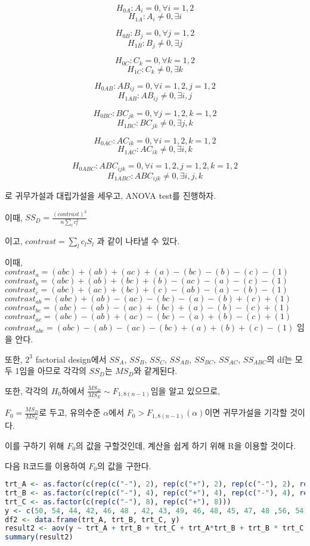 \documentclass{article}
\begin{document}
$$H_{0A} : A_i = 0 , \forall i = 1, 2$$ 
$$H_{1A} : A_i \neq 0, \exists i$$

$$H_{0B} : B_j = 0 , \forall j = 1, 2$$ 
$$H_{1B} : B_j \neq 0, \exists j$$

$$H_{0C} : C_k = 0 , \forall k = 1, 2$$ 
$$H_{1C} : C_k \neq 0, \exists k$$

$$H_{0AB} : AB_{ij} = 0 , \forall i = 1, 2, j = 1, 2$$ 
$$H_{1AB} : AB_{ij} \neq 0, \exists i, j$$

$$H_{0BC} : BC_{jk} = 0 , \forall j = 1, 2, k = 1, 2$$ 
$$H_{1BC} : BC_{jk} \neq 0, \exists j, k$$

$$H_{0AC} : AC_{ik} = 0 , \forall i = 1, 2, k = 1, 2$$ 
$$H_{1AC} : AC_{ik} \neq 0, \exists i, k$$

$$H_{0ABC} : ABC_{ijk} = 0 , \forall i = 1, 2, j = 1, 2, k= 1, 2$$ 
$$H_{1ABC} : ABC_{ijk} \neq 0, \exists i, j, k $$

로 귀무가설과 대립가설을 세우고, ANOVA test를 진행하자.

이때, $SS_D = \frac{(contrast)^2}{n \sum_l c_l^2 }$

이고, $contrast = \sum_l c_l S_l$ 과 같이 나타낼 수 있다.


이때, 
$contrast_a = (abc) + (ab) + (ac) + (a) - (bc) - (b) - (c) - (1)$
$contrast_b = (abc) + (ab) + (bc) + (b) - (ac) - (a) - (c) - (1)$
$contrast_c = (abc) + (ac) + (bc) + (c) - (ab) - (a) - (b) - (1)$
$contrast_{ab} = (abc) + (ab) - (ac) - (bc) - (a) - (b) + (c) + (1)$
$contrast_{bc} = (abc) - (ab) - (ac) + (bc) + (a) - (b) - (c) + (1)$
$contrast_{ac} = (abc) - (ab) + (ac) - (bc) - (a) + (b) - (c) + (1)$
$contrast_{abc} = (abc) - (ab) - (ac) - (bc) + (a) + (b) + (c) - (1)$ 임을 안다.

또한, $2^3$ factorial design에서 $SS_A$, $SS_B$, $SS_C$, $SS_{AB}$, $SS_{BC}$, $SS_{AC}$, $SS_{ABC}$의 df는 모두 1임을 아므로 각각의 $SS_D$는 $MS_D$와 같게된다.

또한, 각각의 $H_0$하에서 $\frac{MS_D}{MS_E} \sim F_{1, 8(n-1)}$임을 알고 있으므로,

$F_0 = \frac{MS_{D}}{MS_E}$로 두고, 유의수준 $\alpha$에서 $F_0 > F_{1, 8(n-1)}(\alpha)$이면 귀무가설을 기각할 것이다.

이를 구하기 위해 $F_0$의 값을 구할것인데, 계산을 쉽게 하기 위해 R을 이용할 것이다.

다음 R코드를 이용하여 $F_0$의 값을 구한다.

\begin{lstlisting}[language=R]
trt_A <- as.factor(c(rep(c("-"), 2), rep(c("+"), 2), rep(c("-"), 2), rep(c("+"), 2),rep(c("-"), 2), rep(c("+"), 2), rep(c("-"), 2), rep(c("+"), 2)))
trt_B <- as.factor(c(rep(c("-"), 4), rep(c("+"), 4), rep(c("-"), 4), rep(c("+"), 4)))
trt_C <- as.factor(c(rep(c("-"), 8), rep(c("+"), 8)))
y <- c(50, 54, 44, 42, 46, 48 , 42, 43, 49, 46, 48, 45, 47, 48 ,56, 54)
df2 <- data.frame(trt_A, trt_B, trt_C, y)
result2 <- aov(y ~ trt_A + trt_B + trt_C + trt_A*trt_B + trt_B * trt_C + trt_A * trt_C + trt_A * trt_B * trt_C, data = df2)
summary(result2)
\end{lstlisting}
\end{document}
